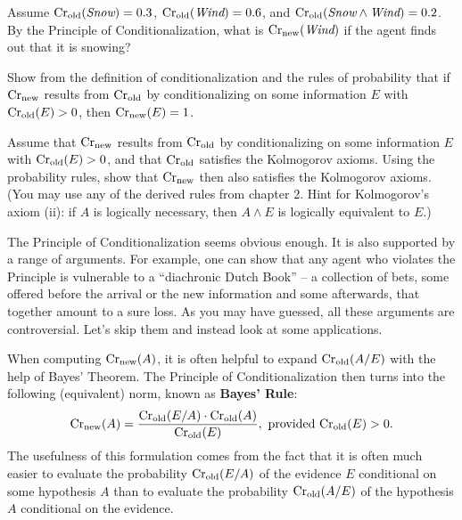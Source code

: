\begin{exercise1}
  Assume $\text{Cr$_{\text{old}}$}(\emph{Snow}) = 0.3$, $\text{Cr$_{\text{old}}$}(\emph{Wind}) = 0.6$, and
  $\text{Cr$_{\text{old}}$}(\emph{Snow} \land \emph{Wind}) = 0.2$. By the Principle of
  Conditionalization, what is $\text{Cr$_{\text{new}}$}(\emph{Wind})$ if the agent finds
  out that it is snowing? 
\end{exercise1}


\begin{exercise2}
  Show from the definition of conditionalization and the rules of
  probability that if $\text{Cr$_{\text{new}}$}$ results from $\text{Cr$_{\text{old}}$}$ by conditionalizing
  on some information $E$ with $\text{Cr$_{\text{old}}$}(E) > 0$, then $\text{Cr$_{\text{new}}$}(E) = 1$.
\end{exercise2}



\begin{exercise3}
  Assume that $\text{Cr$_{\text{new}}$}$ results from $\text{Cr$_{\text{old}}$}$ by conditionalizing on some
  information $E$ with $\text{Cr$_{\text{old}}$}(E) > 0$, and that $\text{Cr$_{\text{old}}$}$ satisfies the
  Kolmogorov axioms. Using the probability rules, show that $\text{Cr$_{\text{new}}$}$
  then also satisfies the Kolmogorov axioms. (You may use any of the
  derived rules from chapter 2. Hint for Kolmogorov's axiom (ii): if
  $A$ is logically necessary, then $A\land E$ is logically equivalent
  to $E$.)
\end{exercise3}


The Principle of Conditionalization seems obvious enough. It is also
supported by a range of arguments. For example, one can show that any
agent who violates the Principle is vulnerable to a ``diachronic Dutch
Book'' -- a collection of bets, some offered before the arrival or the
new information and some afterwards, that together amount to a sure
loss. As you may have guessed, all these arguments are
controversial. Let's skip them and instead look at some applications.

When computing $\text{Cr}_\text{new}(A)$, it is often helpful to expand
$\text{Cr}_\text{old}(A/E)$ with the help of Bayes' Theorem. The Principle
of Conditionalization then turns into the following (equivalent) norm,
known as \textbf{Bayes' Rule}:
%
\[
\text{Cr}_{\text{new}}(A) = \frac{\text{Cr}_{\text{old}}(E/A) \cdot \text{Cr}_{\text{old}}(A)}{\text{Cr}_{\text{old}}(E)}, \text{ provided $\text{Cr}_\text{old}(E) > 0$}.
\]
%
The usefulness of this formulation comes from the fact that it is
often much easier to evaluate the probability $\text{Cr$_{\text{old}}$}(E/A)$ of the
evidence $E$ conditional on some hypothesis $A$  than to
evaluate the probability $\text{Cr$_{\text{old}}$}(A/E)$ of the hypothesis $A$ conditional
on the evidence.


